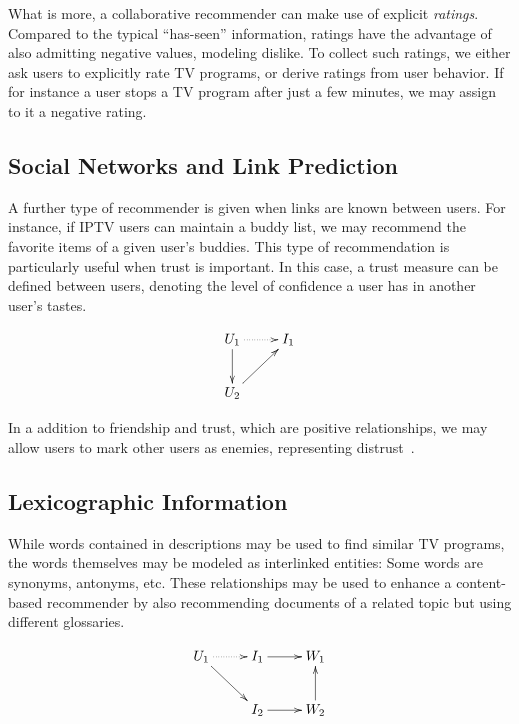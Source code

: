 \documentclass{article}
\begin{document}
What is more, a collaborative recommender can make use of explicit 
\emph{ratings}.  Compared to the typical ``has-seen'' information,
ratings have the advantage of also admitting negative values, modeling
dislike.  To collect such ratings, we either ask users to explicitly
rate TV programs, or derive ratings from user behavior.  If for instance
a user stops a TV program after just a few minutes, we may assign to it
a negative rating. 

\subsection{Social Networks and Link Prediction}
A further type of recommender is given when links are known between
users.  For instance, if IPTV users can maintain a buddy list, 
we may recommend the favorite items of a given user's buddies.  
This type of recommendation is particularly useful when trust is
important.  In this case, a trust measure can be defined between users,
denoting the level of confidence a user has in another user's tastes.  

\begin{displaymath}
  \xymatrix{
    U_1 \ar@{.>}[r]  \ar[d] & I_1 \\
    U_2 \ar[ur]
  }
\end{displaymath}

In a addition to friendship and trust, which are positive relationships,
we may allow users to mark other users as enemies, representing
distrust~\cite{b325,kunegis:slashdot-zoo}.   


\subsection{Lexicographic Information}
While words contained in descriptions may be used to find similar
TV programs, the words themselves may be modeled as interlinked entities:
Some words are synonyms, antonyms, etc.  These relationships may be used
to enhance a content-based recommender by also recommending documents
of a related topic but using different glossaries. 

\begin{displaymath}
  \xymatrix{
    U_1 \ar@{.>}[r] \ar[dr] & I_1 \ar[r] & W_1 \\
    & I_2 \ar[r] & W_2 \ar[u]
  }
\end{displaymath}
\end{document}
